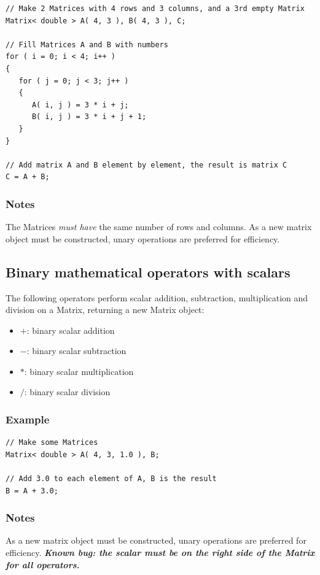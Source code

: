 \documentclass{report}
\begin{document}
\begin{verbatim}
// Make 2 Matrices with 4 rows and 3 columns, and a 3rd empty Matrix
Matrix< double > A( 4, 3 ), B( 4, 3 ), C;

// Fill Matrices A and B with numbers
for ( i = 0; i < 4; i++ )
{
   for ( j = 0; j < 3; j++ )
   {
      A( i, j ) = 3 * i + j;
      B( i, j ) = 3 * i + j + 1;
   }
}

// Add matrix A and B element by element, the result is matrix C
C = A + B;
\end{verbatim}

\subsubsection{Notes}
The Matrices {\em must have} the same number of rows and columns.
As a new matrix object must be constructed, unary operations are
preferred for efficiency.

\subsection{Binary mathematical operators with scalars}

The following operators perform scalar addition, subtraction,
multiplication and division on a Matrix, returning a new Matrix
object:

\begin{itemize}
\item $+$: binary scalar addition
\item $-$: binary scalar subtraction
\item $*$: binary scalar multiplication
\item $/$: binary scalar division
\end{itemize}

\subsubsection{Example}

\begin{verbatim}
// Make some Matrices
Matrix< double > A( 4, 3, 1.0 ), B;

// Add 3.0 to each element of A, B is the result
B = A + 3.0;
\end{verbatim}

\subsubsection{Notes}
As a new matrix object must be constructed, unary operations are
preferred for efficiency.  {\em \bf Known bug: the scalar must
be on the right side of the Matrix for all operators.}
\end{document}
